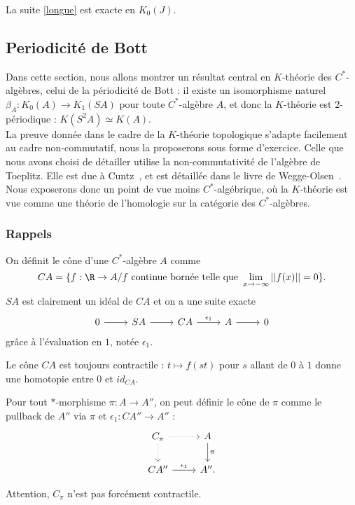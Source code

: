 \begin{prop}
La suite \ref{longue} est exacte en $K_0(J)$.
\end{prop}

\subsection{Periodicité de Bott}

Dans cette section, nous allons montrer un résultat central en $K$-théorie des $C^*$-algèbres, celui de la périodicité de Bott : il existe un isomorphisme naturel $\beta_A : K_0 (A) \rightarrow K_1(SA)$ pour toute $C^*$-algèbre $A$, et donc la $K$-théorie est $2$-périodique : $K(S^2 A )\simeq K(A)$.\\

La preuve donnée dans le cadre de la $K$-théorie topologique s'adapte facilement au cadre non-commutatif, nous la proposerons sous forme d'exercice. Celle que nous avons choisi de détailler utilise la non-commutativité de l'algèbre de Toeplitz. Elle est due à Cuntz~\cite{Cuntz}, et est détaillée dans le livre de Wegge-Olsen~\cite{WeggeOlsen}. Nous exposerons donc un point de vue moins $C^*$-algébrique, où la $K$-théorie est vue comme une théorie de l'homologie sur la catégorie des $C^*$-algèbres.\\

\subsubsection{Rappels}

\begin{definition}
On définit le cône d'une $C^*$-algèbre $A$ comme 
\[CA= \{f:\R \rightarrow A / f \ \text{continue bornée telle que }\lim_{x\rightarrow -\infty} ||f(x)||=0\}.\]
$SA$ est clairement un idéal de $CA$ et on a une suite exacte 
\[\begin{tikzcd} 0\arrow{r} & SA \arrow{r}& CA \arrow{r}{\epsilon_1} & A \arrow{r} & 0\end{tikzcd}\]
grâce à l'évaluation en $1$, notée $\epsilon_1$.\\
\end{definition}

Le cône $CA$ est toujours contractile : $t\mapsto f(st)$ pour $s$ allant de $0$ à $1$ donne une homotopie entre $0$ et $id_{CA}$.\\

\begin{definition}
Pour tout $*$-morphisme $\pi: A\rightarrow A''$, on peut définir le cône de $\pi$ comme le pullback de $A''$ via $\pi$ et 
$\epsilon_1 : CA''\rightarrow A''$ :
\[\begin{tikzcd}
C_\pi \arrow[dotted]{r}\arrow[dotted]{d}& A \arrow{d}{\pi} \\
CA'' \arrow{r}{\epsilon_1} & A''.
\end{tikzcd}\]
\end{definition}
Attention, $C_\pi$ n'est pas forcément contractile.

